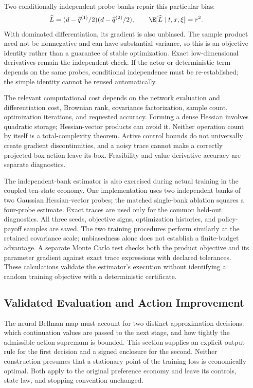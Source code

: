 Two conditionally independent probe banks repair this particular bias:
\begin{equation}\label{eq:crossprobe}
 \widehat L=(d-\widehat q^{(1)}/2)(d-\widehat q^{(2)}/2),
 \qquad\E[\widehat L\mid t,x,\xi]=r^2.
\end{equation}
With dominated differentiation, its gradient is also unbiased. The sample product need not be nonnegative and can have substantial variance, so this is an objective identity rather than a guarantee of stable optimization. Exact low-dimensional derivatives remain the independent check. If the actor or deterministic term depends on the same probes, conditional independence must be re-established; the simple identity cannot be reused automatically.

The relevant computational cost depends on the network evaluation and differentiation cost, Brownian rank, covariance factorization, sample count, optimization iterations, and requested accuracy. Forming a dense Hessian involves quadratic storage; Hessian-vector products can avoid it. Neither operation count by itself is a total-complexity theorem. Active control bounds do not universally create gradient discontinuities, and a noisy trace cannot make a correctly projected box action leave its box. Feasibility and value-derivative accuracy are separate diagnostics.


The independent-bank estimator is also exercised during actual training in the coupled ten-state economy. One implementation uses two independent banks of two Gaussian Hessian-vector probes; the matched single-bank ablation squares a four-probe estimate. Exact traces are used only for the common held-out diagnostics. All three seeds, objective signs, optimization histories, and policy-payoff samples are saved. The two training procedures perform similarly at the retained covariance scale; unbiasedness alone does not establish a finite-budget advantage. A separate Monte Carlo test checks both the product objective and its parameter gradient against exact trace expressions with declared tolerances. These calculations validate the estimator's execution without identifying a random training objective with a deterministic certificate.




\subsection{Validated Evaluation and Action Improvement}\label{sec:r9method}
The neural Bellman map must account for two distinct approximation decisions: which continuation values are passed to the next stage, and how tightly the admissible action supremum is bounded. This section supplies an explicit output rule for the first decision and a signed enclosure for the second. Neither construction presumes that a stationary point of the training loss is economically optimal. Both apply to the original preference economy and leave its controls, state law, and stopping convention unchanged.

